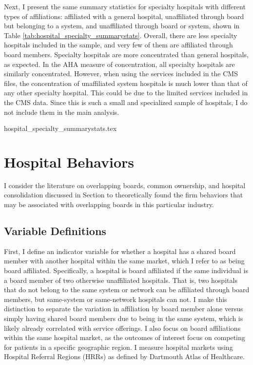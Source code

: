 \documentclass[12pt]{article}
\begin{document}
    Next, I present the same summary statistics for specialty hospitals with different types of affiliations: affiliated with a general hospital, unaffiliated through board but belonging to a system, and unaffiliated through board or system, shown in Table \ref{tab:hospital_specialty_summarystats}. Overall, there are less specialty hospitals included in the sample, and very few of them are affiliated through board members. Specialty hospitals are more concentrated than general hospitals, as expected. In the AHA measure of concentration, all specialty hospitals are similarly concentrated. However, when using the services included in the CMS files, the concentration of unaffiliated system hospitals is much lower than that of any other specialty hospital. This could be due to the limited services included in the CMS data. Since this is such a small and specialized sample of hospitals, I do not include them in the main analysis. 

    {hospital_specialty_summarystats.tex}
    
    

    \section{Hospital Behaviors}\label{sec:hospbehaviors}

    I consider the literature on overlapping boards, common ownership, and hospital consolidation discussed in Section to theoretically found the firm behaviors that may be associated with overlapping boards in this particular industry. 

    \subsection{Variable Definitions}

    First, I define an indicator variable for whether a hospital has a shared board member with another hospital within the same market, which I refer to as being board affiliated. Specifically, a hospital is board affiliated if the same individual is a board member of two otherwise unaffiliated hospitals. That is, two hospitals that do not belong to the same system or network can be affiliated through board members, but same-system or same-network hospitals can not. I make this distinction to separate the variation in affiliation by board member alone versus simply having shared board members due to being in the same system, which is likely already correlated with service offerings. I also focus on board affiliations within the same hospital market, as the outcomes of interest focus on competing for patients in a specific geographic region. I measure hospital markets using Hospital Referral Regions (HRRs) as defined by Dartmouth Atlas of Healthcare.
\end{document}
